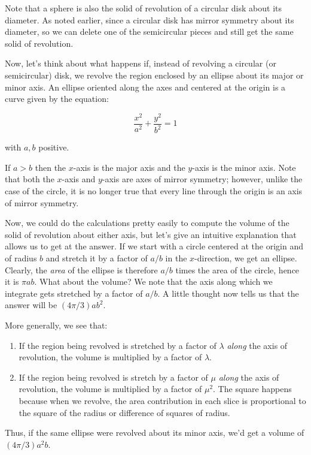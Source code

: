 \documentclass[10pt]{amsart}
\begin{document}
Note that a sphere is also the solid of revolution of a circular disk
about its diameter. As noted earlier, since a circular disk has mirror
symmetry about its diameter, so we can delete one of the semicircular
pieces and still get the same solid of revolution.

Now, let's think about what happens if, instead of revolving a
circular (or semicircular) disk, we revolve the region enclosed by an
ellipse about its major or minor axis. An ellipse oriented along the
axes and centered at the origin is a curve given by the equation:

$$\frac{x^2}{a^2} + \frac{y^2}{b^2} = 1$$

with $a,b$ positive.

If $a > b$ then the $x$-axis is the major axis and the $y$-axis is the
minor axis. Note that both the $x$-axis and $y$-axis are axes of
mirror symmetry; however, unlike the case of the circle, it is no
longer true that every line through the origin is an axis of mirror
symmetry.

Now, we could do the calculations pretty easily to compute the volume
of the solid of revolution about either axis, but let's give an
intuitive explanation that allows us to get at the answer. If we start
with a circle centered at the origin and of radius $b$ and stretch it
by a factor of $a/b$ in the $x$-direction, we get an ellipse. Clearly,
the {\em area} of the ellipse is therefore $a/b$ times the area of the
circle, hence it is $\pi a b$. What about the volume? We note that the
axis along which we integrate gets stretched by a factor of $a/b$. A
little thought now tells us that the answer will be $(4\pi/3)ab^2$.

More generally, we see that:

\begin{enumerate}
\item If the region being revolved is stretched by a factor of
  $\lambda$ {\em along} the axis of revolution, the volume is
  multiplied by a factor of $\lambda$.
\item If the region being revolved is stretch by a factor of $\mu$
  {\em along} the axis of revolution, the volume is multiplied by a
  factor of $\mu^2$. The square happens because when we revolve, the
  area contribution in each slice is proportional to the square of the
  radius or difference of squares of radius.
\end{enumerate}

Thus, if the same ellipse were revolved about its minor axis, we'd get
a volume of $(4\pi/3)a^2b$.
\end{document}
